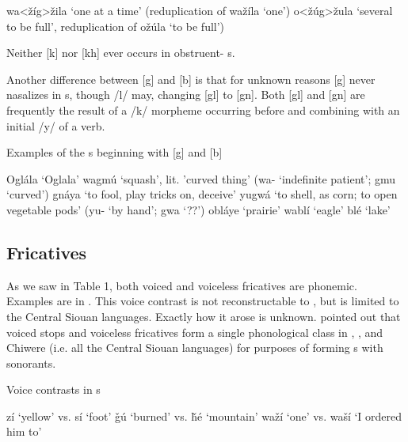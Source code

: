\documentclass[output=paper]{LSP/langsci}
\begin{document}
\begin{exe}
\ex\label{ex:rood:2}
 \begin{xlist}
\ex wa<\v{z}\'ig>\v{z}ila `one at a time' (reduplication of wa\v{z}\'ila `one')
\ex o<\v{z}\'ug>\v{z}ula `several to be full', reduplication of o\v{z}\'ula `to be full')
\end{xlist}
\end{exe}

Neither [k] nor [kh] ever occurs in obstruent- s. 

Another difference between [g] and [b] is that for unknown reasons [g] never nasalizes in  s, though /l/ may, changing [gl] to [gn]. Both [gl] and [gn] are frequently the result of a /k/ morpheme occurring before and combining with an initial /y/ of a verb.

\begin{exe}
\ex \label{ex:rood:3}
Examples of the s beginning with [g] and [b]
\begin{xlist}
\ex Ogl\'ala `Oglala'
\ex wagm\'u `squash', lit. 'curved thing' (wa- `indefinite patient'; gmu `curved')
\ex gn\'aya `to fool, play tricks on, deceive'
\ex yugw\'a `to shell, as corn; to open vegetable pods' (yu- `by hand'; gwa `??')
\ex obl\'aye `prairie'
\ex wabl\'i `eagle'
\ex bl\'e `lake'
\end{xlist}
\end{exe}

\subsection{Fricatives}

As we saw in Table 1, both voiced and voiceless fricatives are phonemic. Examples are in . This voice contrast is not reconstructable to , but is limited to the Central Siouan languages. Exactly how it arose is unknown. \citet{Miner1979a} pointed out that voiced stops and voiceless fricatives form a single phonological class in , ,  and Chiwere (i.e. all the Central Siouan languages) for purposes of forming s with sonorants.

\begin{exe}
\ex \label{ex:rood:4}
Voice contrasts in  s
\begin{xlist}
\ex z\'i `yellow' vs. s\'i `foot'
\ex \v{g}\'u `burned' vs. \v{h}\'e `mountain'
\ex wa\v{z}\'i `one' vs. wa\v{s}\'i `I ordered him to'
\end{xlist}
\end{exe}
\end{document}
